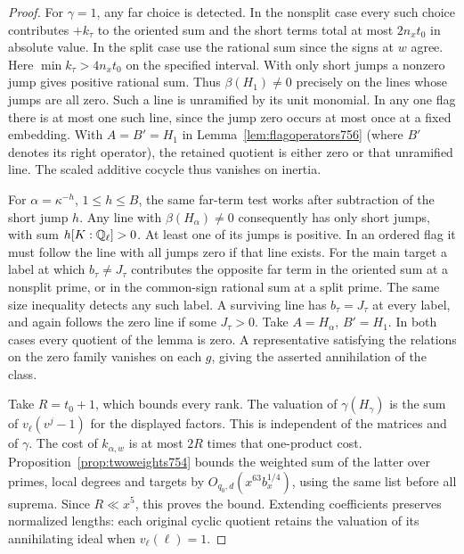 \documentclass[a4paper,11pt]{article}
\theoremstyle{definition}
\theoremstyle{remark}
\numberwithin{equation}{section}
\begin{document}
\begin{proof}
For \(\gamma=1\), any far choice is detected. In the nonsplit case
every such choice contributes \(+k_\tau\) to the oriented sum and
the short terms total at most \(2n_xt_0\) in absolute value. In
the split case use the rational sum since the signs at \(w\) agree.
Here \(\min k_\tau>4n_xt_0\) on the specified interval. With
only short jumps a nonzero jump gives positive rational sum.
Thus \(\beta(H_1)\ne0\) precisely on the lines whose jumps are
all zero. Such a line is unramified by its unit monomial. In any
one flag there is at most one such line, since the jump zero
occurs at most once at a fixed embedding. With \(A=B'=H_1\)
in Lemma~\ref{lem:flagoperators756} (where \(B'\) denotes its
right operator), the retained quotient is either zero or that
unramified line. The scaled additive cocycle thus vanishes on
inertia.

For \(\alpha=\kappa^{-h}\), \(1\le h\le B\), the same far-term
test works after subtraction of the short jump \(h\). Any line
with \(\beta(H_\alpha)\ne0\) consequently has only short jumps,
with sum \(h[K:\mathbb Q_\ell]>0\). At least one of its jumps is
positive. In an ordered flag it must follow the line with all
jumps zero if that line exists. For the main target a label at
which \(b_\tau\ne J_\tau\) contributes the opposite far term in
the oriented sum at a nonsplit prime, or in the common-sign
rational sum at a split prime. The same size inequality detects
any such label. A surviving line has \(b_\tau=J_\tau\) at every
label, and again follows the zero line if some \(J_\tau>0\).
Take \(A=H_\alpha\), \(B'=H_1\). In both cases every quotient
of the lemma is zero. A representative satisfying the relations
on the zero family vanishes on each \(g\), giving the asserted
annihilation of the class.

Take \(R=t_0+1\), which bounds every rank. The valuation of
\(\gamma(H_\gamma)\) is the sum of \(v_\ell(v^j-1)\) for the
displayed factors. This is independent of the matrices and of
\(\gamma\). The cost of \(k_{\alpha,w}\) is at most \(2R\) times
that one-product cost. Proposition~\ref{prop:twoweights754}
bounds the weighted sum of the latter over primes, local degrees
and targets by \(O_{q_0,d}(x^{63}b_x^{1/4})\), using the same
list before all suprema. Since \(R\ll x^5\), this proves the
bound. Extending coefficients preserves normalized lengths:
each original cyclic quotient retains the valuation of its
annihilating ideal when \(v_\ell(\ell)=1\).
\end{proof}
\end{document}
